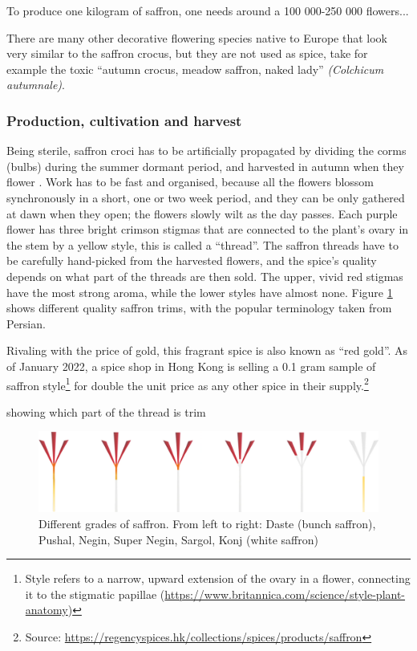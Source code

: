 To produce one kilogram of saffron, one needs around a 100 000-250 000 flowers...



There are many other decorative flowering species native to Europe that look very similar to the saffron crocus, but they are not used as spice, take for example the toxic ``autumn crocus, meadow saffron, naked lady'' \textit{(Colchicum autumnale)}.







\subsubsection{Production, cultivation and harvest}

Being sterile, saffron croci has to be artificially propagated by dividing the corms (bulbs) during the summer dormant period, and harvested in autumn when they flower \autocite[124]{van_wyk_culinary_2014}. Work has to be fast and organised, because all the flowers blossom synchronously in a short, one or two week period, and they can be only gathered at dawn when they open; the flowers slowly wilt as the day passes. Each purple flower has three bright crimson stigmas that are connected to the plant's ovary in the stem by a yellow style, this is called a ``thread''. The saffron threads have to be carefully hand-picked from the harvested flowers, and the spice's quality depends on what part of the threads are then sold. The upper, vivid red stigmas have the most strong aroma, while the lower styles have almost none. Figure \ref{fig:saffron_grades} shows different quality saffron trims, with the popular terminology taken from Persian.

Rivaling with the price of gold, this fragrant spice is also known as ``red gold''. As of January 2022, a spice shop in Hong Kong is selling a 0.1 gram sample of saffron style\footnote{Style refers to a narrow, upward extension of the ovary in a flower, connecting it to the stigmatic papillae (\url{https://www.britannica.com/science/style-plant-anatomy})} for double the unit price as any other spice in their supply.\footnote{Source: \url{https://regencyspices.hk/collections/spices/products/saffron}}

showing which part of the thread is trim


\begin{figure}[!hbt]
    \centering
    \includegraphics[width=\linewidth]{imgs/saffron_grades.png}
    \caption{Different grades of saffron. From left to right: Daste (bunch saffron), Pushal, Negin, Super Negin, Sargol, Konj (white saffron)}
    \label{fig:saffron_grades}
\end{figure}






